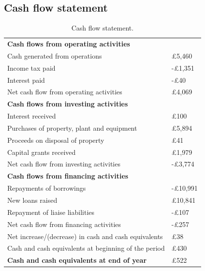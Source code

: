 \subsection{Cash flow statement}
\begin{table}[H]
    \centering
    \begin{tabular}{@{}ll@{}}
        \toprule
        \textbf{Cash flows from operating activities}        &                 \\
        Cash generated from operations                       & \pounds 5,460   \\
        Income tax paid                                      & -\pounds 1,351  \\
        Interest paid                                        & -\pounds 40     \\
        \midrule
        Net cash flow from operating activities              & \pounds 4,069   \\
        \midrule
        \textbf{Cash flows from investing activities}        &                 \\
        Interest received                                    & \pounds 100     \\
        Purchases of property, plant and equipment           & \pounds 5,894   \\
        Proceeds on disposal of property                     & \pounds 41      \\
        Capital grants received                              & \pounds 1,979   \\
        \midrule
        Net cash flow from investing activities              & -\pounds 3,774  \\
        \midrule
        \textbf{Cash flows from financing activities}        &                 \\
        Repayments of borrowings                             & -\pounds 10,991 \\
        New loans raised                                     & \pounds 10,841  \\
        Repayment of liaise liabilities                      & -\pounds 107    \\
        \midrule
        Net cash flow from financing activities              & -\pounds 257    \\
        \midrule
        Net increase/(decrease) in cash and cash equivalents & \pounds 38      \\
        Cash and cash equivalents at beginning of the period & \pounds 430     \\
        \midrule
        \textbf{Cash and cash equivalents at end of year}    & \pounds 522     \\
        \bottomrule
    \end{tabular}
    \caption{Cash flow statement.}
\end{table}
